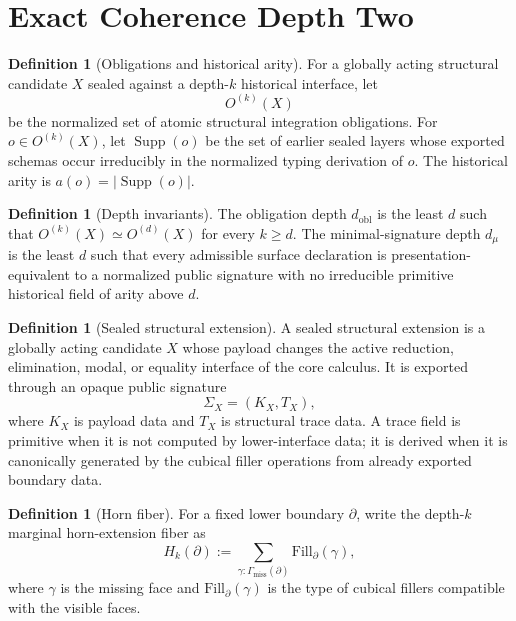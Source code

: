 \documentclass[11pt]{article}
\theoremstyle{plain}
\theoremstyle{definition}
\newtheorem{definition}[theorem]{Definition}
\theoremstyle{remark}
\newcommand{\Supp}{\operatorname{Supp}}
\begin{document}
\section{Exact Coherence Depth Two}

\begin{definition}[Obligations and historical arity]
For a globally acting structural candidate \(X\) sealed against a depth-\(k\) historical interface, let
\[
O^{(k)}(X)
\]
be the normalized set of atomic structural integration obligations. For \(o\in O^{(k)}(X)\), let \(\Supp(o)\) be the set of earlier sealed layers whose exported schemas occur irreducibly in the normalized typing derivation of \(o\). The historical arity is \(a(o)=|\Supp(o)|\).
\end{definition}

\begin{definition}[Depth invariants]
The obligation depth \(d_{\mathrm{obl}}\) is the least \(d\) such that \(O^{(k)}(X)\simeq O^{(d)}(X)\) for every \(k\ge d\). The minimal-signature depth \(d_\mu\) is the least \(d\) such that every admissible surface declaration is presentation-equivalent to a normalized public signature with no irreducible primitive historical field of arity above \(d\).
\end{definition}

\begin{definition}[Sealed structural extension]
A sealed structural extension is a globally acting candidate \(X\) whose payload changes the active reduction, elimination, modal, or equality interface of the core calculus. It is exported through an opaque public signature
\[
\Sigma_X=(K_X,T_X),
\]
where \(K_X\) is payload data and \(T_X\) is structural trace data. A trace field is primitive when it is not computed by lower-interface data; it is derived when it is canonically generated by the cubical filler operations from already exported boundary data.
\end{definition}

\begin{definition}[Horn fiber]
For a fixed lower boundary \(\partial\), write the depth-\(k\) marginal horn-extension fiber as
\[
H_k(\partial)
:=
\sum_{\gamma:\Gamma_{\mathrm{miss}}(\partial)}
\mathrm{Fill}_{\partial}(\gamma),
\]
where \(\gamma\) is the missing face and \(\mathrm{Fill}_{\partial}(\gamma)\) is the type of cubical fillers compatible with the visible faces.
\end{definition}
\end{document}

